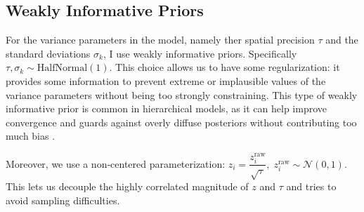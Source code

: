 \documentclass[12pt]{article}
\begin{document}
\subsection{Weakly Informative Priors}

For the variance parameters in the model, namely ther spatial precision $\tau$ and the standard deviations $\sigma_k$, I use weakly informative priors. Specifically $\tau, \sigma_k \sim \text{HalfNormal}(1)$. This choice allows us to have some regularization: it provides some information to prevent extreme or implausible values of the variance parameters without being too strongly constraining. This type of weakly informative prior is common in hierarchical models, as it can help improve convergence and guards against overly diffuse posteriors without contributing too much bias \parencite{gelman2006prior}.


Moreover, we use a non‑centered parameterization: $z_i = \dfrac{z_i^{\mathrm{raw}}}{\sqrt{\tau}},\; z_i^{\mathrm{raw}}\sim\mathcal N(0,1)$. This lets us decouple the highly correlated magnitude of $z$ and $\tau$ and tries to avoid sampling difficulties.
\end{document}
